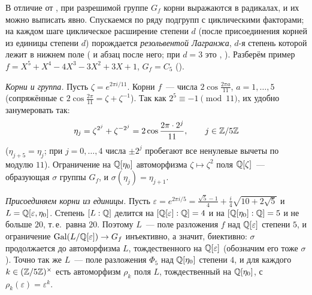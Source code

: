 \begin{aside}
В отличие от , при разрешимой группе $G_f$ корни выражаются в радикалах, и их можно выписать явно. Спускаемся по ряду
подгрупп с циклическими факторами; на каждом шаге циклическое расширение степени $d$ (после присоединения корней из
единицы степени $d$) порождается \emph{резольвентой Лагранжа}, $d$-я степень которой лежит в нижнем поле ( и абзац
после него; при $d=3$ это , ). Разберём пример $f=X^5+X^4-4X^3-3X^2+3X+1$, $G_f=C_5$ ().

\emph{Корни и группа.} Пусть $\zeta=e^{2\pi i/11}$. Корни $f$~--- числа $2\cos\frac{2\pi a}{11}$, $a=1,\dots,5$ (сопряжённые с
$2\cos\frac{2\pi}{11}=\zeta+\zeta^{-1}$). Так как $2^5\equiv-1\pmod{11}$, их удобно занумеровать так:
\[
\eta_j=\zeta^{2^j}+\zeta^{-2^j}=2\cos\frac{2\pi\cdot2^j}{11},\qquad j\in\mathbb Z/5\mathbb Z
\]
($\eta_{j+5}=\eta_j$; при $j=0,\dots,4$ числа $\pm2^j$ пробегают все ненулевые вычеты по модулю $11$). Ограничение на
$\mathbb Q[\eta_0]$ автоморфизма $\zeta\mapsto\zeta^2$ поля $\mathbb Q[\zeta]$~--- образующая $\sigma$ группы $G_f$, и $\sigma(\eta_j)=\eta_{j+1}$.

\emph{Присоединяем корни из единицы.} Пусть $\varepsilon=e^{2\pi i/5}=\frac{\sqrt5-1}4+\frac i4\sqrt{10+2\sqrt5}$ и
$L=\mathbb Q[\varepsilon,\eta_0]$. Степень $[L:\mathbb Q]$ делится на $[\mathbb Q[\varepsilon]:\mathbb Q]=4$ и на $[\mathbb Q[\eta_0]:\mathbb Q]=5$ и не больше $20$, т.\,е.\
равна $20$. Поэтому $L$~--- поле разложения $f$ над $\mathbb Q[\varepsilon]$ степени $5$, и ограничение
$\operatorname{Gal}(L/\mathbb Q[\varepsilon])\to G_f$ инъективно, а значит, биективно: $\sigma$ продолжается до автоморфизма $L$, тождественного
на $\mathbb Q[\varepsilon]$ (обозначим его тоже $\sigma$). Точно так же $L$~--- поле разложения $\Phi_5$ над $\mathbb Q[\eta_0]$ степени $4$, и
для каждого $k\in(\mathbb Z/5\mathbb Z)^\times$ есть автоморфизм $\rho_k$ поля $L$, тождественный на $\mathbb Q[\eta_0]$, с
$\rho_k(\varepsilon)=\varepsilon^k$.


\end{aside}
